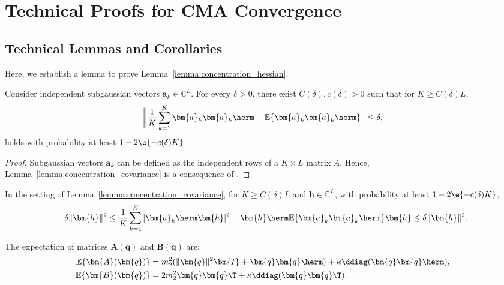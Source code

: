 \chapter{Technical Proofs for CMA Convergence}
\label{appdx:wf}
\section{Technical Lemmas and Corollaries} \label{appdx:technical}
Here, we establish a lemma to prove Lemma~\ref{lemma:concentration_hessian}. 
\begin{lem}
	\label{lemma:concentration_covariance}
	Consider independent subgaussian vectors $\bm{a}_k\in\mathbb{C}^L$. For every $\delta>0$, there exist $C(\delta),c(\delta)>0$ such that for $K\geq C(\delta)L$,
	\begin{equation}
		\bigg\|\frac{1}{K}\sum_{k=1}^K\bm{a}_k\bm{a}_k\herm-\mathbb{E}\{\bm{a}_k\bm{a}_k\herm\}\bigg\| \leq \delta,\nonumber%
	\end{equation}
	holds with probability at least $1-2\e{-c(\delta) K}$.
\end{lem}
\begin{proof} Subgaussian vectors $\bm{a}_k$ can be defined as the independent rows of a $K\times L$ matrix $A$. Hence, Lemma~\ref{lemma:concentration_covariance} is a consequence of \cite[Theorem 5.39]{Vershynin2012nonasymptoticmatrices}.
\end{proof}	

\begin{cor} \label{cor:abs_s}	 
	In the setting of Lemma~\ref{lemma:concentration_covariance}, for $K\geq C(\delta)L$ and $\bm{h}\in\mathbb{C}^L$, with probability at least $1-2\e{-c(\delta) K}$,
	\begin{equation}
		-\delta\|\bm{h}\|^2\leq \frac{1}{K}\sum_{k=1}^K|\bm{a}_k\herm\bm{h}|^2- \bm{h}\herm\mathbb{E}\{\bm{a}_k\bm{a}_k\herm\}\bm{h}\leq\delta\|\bm{h}\|^2. \nonumber%
	\end{equation}
\end{cor}

The expectation of matrices $\bm{A}(\bm{q})$ and $\bm{B}(\bm{q})$ are:
\begin{align}
	\mathbb{E}\{\bm{A}(\bm{q})\}&=m_2^2(\|\bm{q}\|^2\bm{I} +\bm{q}\bm{q}\herm) + \kappa\ddiag(\bm{q}\bm{q}\herm),\nonumber\\
	\mathbb{E}\{\bm{B}(\bm{q})\}&=2  m_2^2\bm{q}\bm{q}\T+\kappa\ddiag(\bm{q}\bm{q}\T).\nonumber
\end{align}


